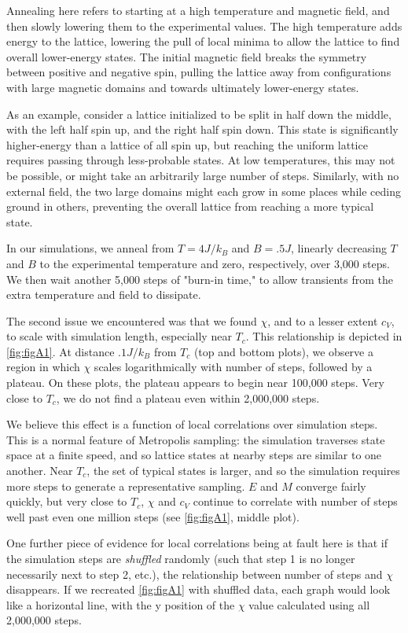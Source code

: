 \documentclass[letter,scriptaddress,twocolumn, prl,nofootinbib]{revtex4}
\begin{document}
Annealing here refers to starting at a high temperature and magnetic field, and then slowly lowering them to the experimental values. The high temperature adds energy to the lattice, lowering the pull of local minima to allow the lattice to find overall lower-energy states. The initial magnetic field breaks the symmetry between positive and negative spin, pulling the lattice away from configurations with large magnetic domains and towards ultimately lower-energy states. 

As an example, consider a lattice initialized to be split in half down the middle, with the left half spin up, and the right half spin down. This state is significantly higher-energy than a lattice of all spin up, but reaching the uniform lattice requires passing through less-probable states. At low temperatures, this may not be possible, or might take an arbitrarily large number of steps. Similarly, with no external field, the two large domains might each grow in some places while ceding ground in others, preventing the overall lattice from reaching a more typical state.

In our simulations, we anneal from $T = 4 J/k_B$ and $B = .5 J$, linearly decreasing $T$ and $B$ to the experimental temperature and zero, respectively, over 3,000 steps. We then wait another 5,000 steps of "burn-in time," to allow transients from the extra temperature and field to dissipate.

The second issue we encountered was that we found $\chi$, and to a lesser extent $c_V$, to scale with simulation length, especially near $T_c$. This relationship is depicted in \autoref{fig:figA1}. At distance $.1 J/k_B$ from $T_c$ (top and bottom plots), we observe a region in which $\chi$ scales logarithmically with number of steps, followed by a plateau. On these plots, the plateau appears to begin near 100,000 steps. Very close to $T_c$, we do not find a plateau even within 2,000,000 steps.

We believe this effect is a function of local correlations over simulation steps. This is a normal feature of Metropolis sampling: the simulation traverses state space at a finite speed, and so lattice states at nearby steps are similar to one another. Near $T_c$, the set of typical states is larger, and so the simulation requires more steps to generate a representative sampling. $E$ and $M$ converge fairly quickly, but very close to $T_c$, $\chi$ and $c_V$ continue to correlate with number of steps well past even one million steps (see \autoref{fig:figA1}, middle plot).

One further piece of evidence for local correlations being at fault here is that if the simulation steps are \textit{shuffled} randomly (such that step 1 is no longer necessarily next to step 2, etc.), the relationship between number of steps and $\chi$ disappears. If we recreated \autoref{fig:figA1} with shuffled data, each graph would look like a horizontal line, with the y position of the $\chi$ value calculated using all 2,000,000 steps.
\end{document}
